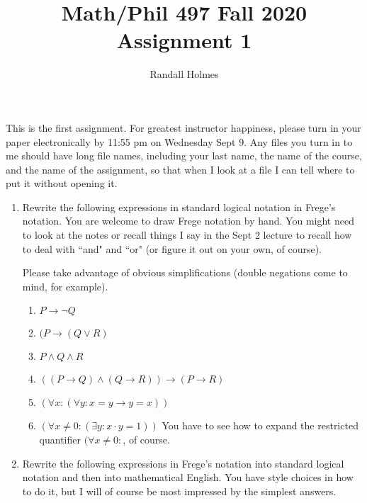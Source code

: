 \documentclass[12pt]{article}
\title{Math/Phil 497 Fall 2020 Assignment 1}
\author{Randall Holmes}
\begin{document}
\maketitle

This is the first assignment.  For greatest instructor happiness, please turn in your paper electronically by 11:55 pm on Wednesday Sept 9.  Any files you turn in to me should have long file names, including your last name, the name of the course, and the name of the assignment, so that when I look at a file I can tell where to put it without opening it.

\begin{enumerate}

\item  Rewrite the following expressions in standard logical notation in Frege's notation.  You are welcome to draw Frege notation by hand.  You might need to look at the notes
or recall things I say in the Sept 2 lecture to recall how to deal with ``and" and ``or" (or figure it out on your own, of course).

Please take advantage of obvious simplifications (double negations come to mind, for example).

\begin{enumerate}

\item $P \rightarrow \neg Q$

\item$(P \rightarrow (Q \vee R)$

\item $P \wedge Q \wedge R$

\item  $((P \rightarrow Q) \wedge (Q \rightarrow R)) \rightarrow (P \rightarrow R)$

\item $(\forall x:(\forall y: x = y \rightarrow y = x))$

\item $(\forall x \neq 0:(\exists y:x\cdot y = 1))$  You have to see how to expand the restricted quantifier $(\forall x \neq 0:$, of course.


\end{enumerate}



\item Rewrite the following expressions in Frege's notation into standard logical notation and then into mathematical English.  You have style choices in how to do it, but I will of course be most impressed by the simplest answers.


\end{enumerate}
\end{document}
